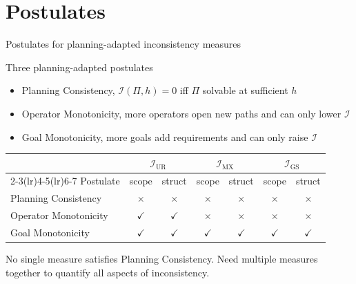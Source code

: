 \section{Postulates}

\begin{frame}{Postulates for planning-adapted inconsistency measures}
    \begin{block}{Three planning-adapted postulates}
        \begin{itemize}
            \item Planning Consistency, $\mathcal{I}(\Pi, h) = 0$ iff $\Pi$ solvable at sufficient $h$
            \item Operator Monotonicity, more operators open new paths and can only lower $\mathcal{I}$
            \item Goal Monotonicity, more goals add requirements and can only raise $\mathcal{I}$
        \end{itemize}
    \end{block}

    \begin{center}
        \footnotesize
        \begin{tabular}{l cc cc cc}
            \toprule
                                  & \multicolumn{2}{c}{$\mathcal{I}_{\text{UR}}$} & \multicolumn{2}{c}{$\mathcal{I}_{\text{MX}}$} & \multicolumn{2}{c}{$\mathcal{I}_{\text{GS}}$}                                              \\
            \cmidrule(lr){2-3}\cmidrule(lr){4-5}\cmidrule(lr){6-7}
            Postulate             & scope                                         & struct                                        & scope                                         & struct       & scope        & struct       \\
            \midrule
            Planning Consistency  & $\times$                                      & $\times$                                      & $\times$                                      & $\times$     & $\times$     & $\times$     \\
            Operator Monotonicity & $\checkmark$                                  & $\checkmark$                                  & $\times$                                      & $\times$     & $\times$     & $\times$     \\
            Goal Monotonicity     & $\checkmark$                                  & $\checkmark$                                  & $\checkmark$                                  & $\checkmark$ & $\checkmark$ & $\checkmark$ \\
            \bottomrule
        \end{tabular}
    \end{center}

    {\small No single measure satisfies Planning Consistency. Need multiple measures together to quantify all aspects of inconsistency.}

\end{frame}
